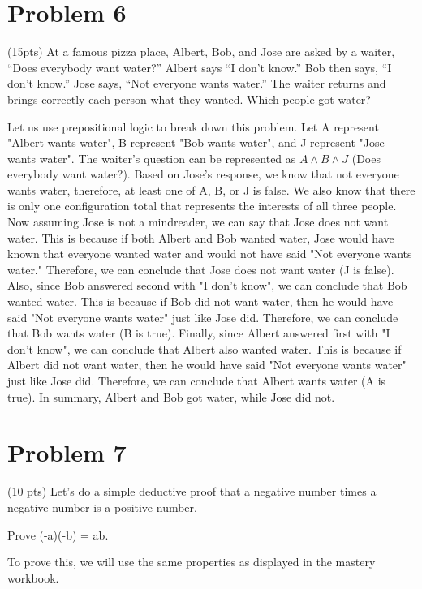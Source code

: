 \documentclass{article}
\begin{document}
\clearpage

\section{Problem 6} 
(15pts) At a famous pizza place, Albert, Bob, and Jose are asked by a waiter, “Does everybody want water?” Albert says “I don’t know.” Bob then says, “I don’t know.” Jose says, “Not everyone wants water.” The waiter returns and brings correctly each person what they wanted. Which people got water?

\bigbreak
Let us use prepositional logic to break down this problem. Let A represent "Albert wants water", B represent "Bob wants water", and J represent "Jose wants water". The waiter's question can be represented as $A \land B \land J$ (Does everybody want water?). Based on Jose's response, we know that not everyone wants water, therefore, at least one of A, B, or J is false. We also know that there is only one configuration total that represents the interests of all three people. Now assuming Jose is not a mindreader, we can say that Jose does not want water. This is because if both Albert and Bob wanted water, Jose would have known that everyone wanted water and would not have said "Not everyone wants water." Therefore, we can conclude that Jose does not want water (J is false). Also, since Bob answered second with "I don't know", we can conclude that Bob wanted water. This is because if Bob did not want water, then he would have said "Not everyone wants water" just like Jose did. Therefore, we can conclude that Bob wants water (B is true). Finally, since Albert answered first with "I don't know", we can conclude that Albert also wanted water. This is because if Albert did not want water, then he would have said "Not everyone wants water" just like Jose did. Therefore, we can conclude that Albert wants water (A is true). In summary, Albert and Bob got water, while Jose did not.

\clearpage

\section{Problem 7}

(10 pts) Let’s do a simple deductive proof that a negative number times a negative
number is a positive number.

Prove (-a)(-b) = ab.

To prove this, we will use the same properties as displayed in the mastery workbook.
\end{document}
